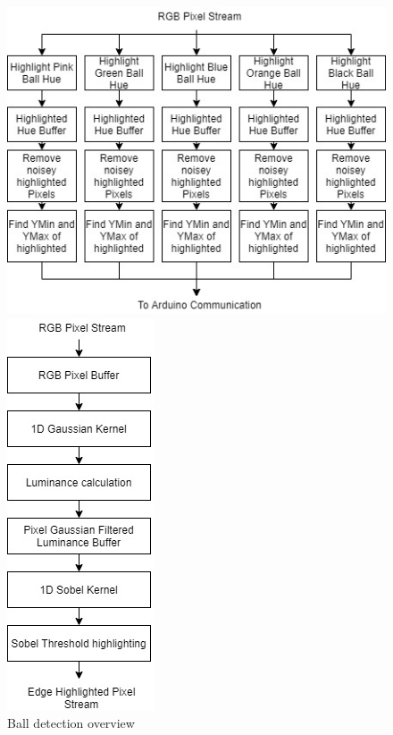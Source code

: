 \documentclass[10pt,twoside]{article}
\begin{document}
\begin{figure}[!htb]
    \centering
    \begin{minipage}{.33\textwidth}
        \centering
        \includegraphics[width=0.8\linewidth, height=0.2\textheight]{BallDetection.jpg}
        \caption{Ball detection overview}
        \label{fig:BallDetectionOverview}
    \end{minipage}%
    \begin{minipage}{0.33\textwidth}
        \centering
        \includegraphics[width=0.4\linewidth, height=0.25\textheight]{EdgeDetection.jpg}

\end{minipage}
\end{figure}
\end{document}

